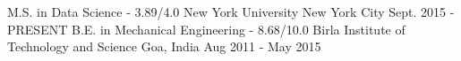 \begin{cventries}
  \cventry
    {M.S. in Data Science - 3.89/4.0}
    {New York University}
    {New York City}
    {Sept. 2015 - PRESENT}
    {
    }
  \cventry
    {B.E. in Mechanical Engineering - 8.68/10.0}
    {Birla Institute of Technology and Science}
    {Goa, India}
    {Aug 2011 - May 2015}
    {
    }
\end{cventries}

